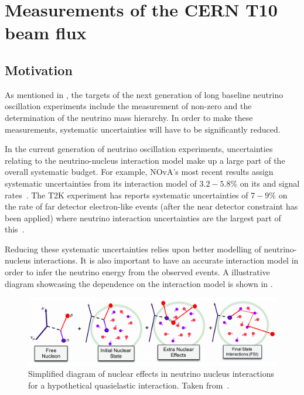 \chapter{Measurements of the CERN T10 beam flux}
\label{sec:hptpc_beam_flux}

\section{Motivation}
\label{sec:hptpc_beam_flux:motivation}

As mentioned in , the targets of the next generation of long baseline neutrino oscillation experiments include the measurement of non-zero \dcp and the determination of the neutrino mass hierarchy.
In order to make these measurements, systematic uncertainties will have to be significantly reduced.

In the current generation of neutrino oscillation experiments, uncertainties relating to the neutrino-nucleus interaction model make up a large part of the overall systematic budget.
For example, NOvA's most recent results assign systematic uncertainties from its interaction model of $3.2-5.8\%$ on its \nue and \anue signal rates~\cite{novaRecent}.
The T2K experiment has reports systematic uncertainties of $7-9\%$ on the rate of far detector electron-like events (after the near detector constraint has been applied) where neutrino interaction uncertainties are the largest part of this~\cite{t2kRecent}.

Reducing these systematic uncertainties relies upon better modelling of neutrino-nucleus interactions.
It is also important to have an accurate interaction model in order to infer the neutrino energy from the observed events.
A illustrative diagram showcasing the dependence on the interaction model is shown in .

\begin{figure}[h]
  \centering
  \includegraphics[width=\linewidth]{files/figures/hptpc_beam_flux/fsiDiag}
  \caption[Simplified diagram of nuclear effects in neutrino nucleus interactions]{Simplified diagram of nuclear effects in neutrino nucleus interactions for a hypothetical quasielastic \numu interaction. Taken from~\cite{nuisanceTalk}.}
  \label{fig:fsiDiag}
\end{figure}

